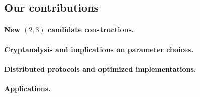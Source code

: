 \subsection{Our contributions}


\paragraph{New $(2,3)$ candidate constructions.}

\paragraph{Cryptanalysis and implications on parameter choices.}


\paragraph{Distributed protocols and optimized implementations.}


\paragraph{Applications.}


\newpage
